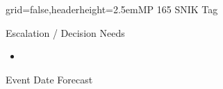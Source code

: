 \documentclass[english]{kiesgrube}
\begin{document}
\begin{poster}{grid=false,headerheight=2.5em}{}{MP 165 SNIK Tag}{}{}
\begin{posterbox}[name=escalation,column=1,below=risks]{Escalation / Decision Needs}
\begin{itemize}
\item 
\end{itemize}
\end{posterbox}
\begin{posterbox}[name=event,column=0,below=progress]{Event Date Forecast}
\begin{tabulary}{\textwidth}{lL}
\end{tabulary}
\end{posterbox}
\footer{}
\end{poster}

\newpage
\end{document}
